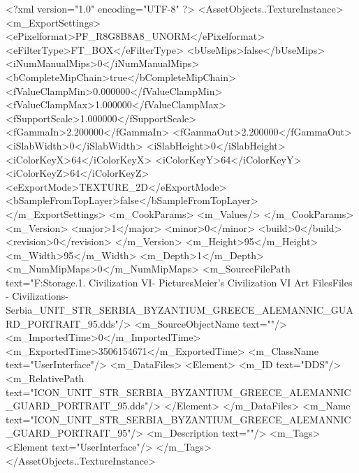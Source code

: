 <?xml version="1.0" encoding="UTF-8" ?>
<AssetObjects..TextureInstance>
	<m_ExportSettings>
		<ePixelformat>PF_R8G8B8A8_UNORM</ePixelformat>
		<eFilterType>FT_BOX</eFilterType>
		<bUseMips>false</bUseMips>
		<iNumManualMips>0</iNumManualMips>
		<bCompleteMipChain>true</bCompleteMipChain>
		<fValueClampMin>0.000000</fValueClampMin>
		<fValueClampMax>1.000000</fValueClampMax>
		<fSupportScale>1.000000</fSupportScale>
		<fGammaIn>2.200000</fGammaIn>
		<fGammaOut>2.200000</fGammaOut>
		<iSlabWidth>0</iSlabWidth>
		<iSlabHeight>0</iSlabHeight>
		<iColorKeyX>64</iColorKeyX>
		<iColorKeyY>64</iColorKeyY>
		<iColorKeyZ>64</iColorKeyZ>
		<eExportMode>TEXTURE_2D</eExportMode>
		<bSampleFromTopLayer>false</bSampleFromTopLayer>
	</m_ExportSettings>
	<m_CookParams>
		<m_Values/>
	</m_CookParams>
	<m_Version>
		<major>1</major>
		<minor>0</minor>
		<build>0</build>
		<revision>0</revision>
	</m_Version>
	<m_Height>95</m_Height>
	<m_Width>95</m_Width>
	<m_Depth>1</m_Depth>
	<m_NumMipMaps>0</m_NumMipMaps>
	<m_SourceFilePath text="F:\Mod Storage\2.1. Civilization VI\Mods\Archive - Pictures\Sid Meier's Civilization VI Art Files\Art Files - Civilizations\Civilization - Serbia\ICON_UNIT_STR_SERBIA_BYZANTIUM_GREECE_ALEMANNIC_GUARD_PORTRAIT_95.dds"/>
	<m_SourceObjectName text=""/>
	<m_ImportedTime>0</m_ImportedTime>
	<m_ExportedTime>3506154671</m_ExportedTime>
	<m_ClassName text="UserInterface"/>
	<m_DataFiles>
		<Element>
			<m_ID text="DDS"/>
			<m_RelativePath text="ICON_UNIT_STR_SERBIA_BYZANTIUM_GREECE_ALEMANNIC_GUARD_PORTRAIT_95.dds"/>
		</Element>
	</m_DataFiles>
	<m_Name text="ICON_UNIT_STR_SERBIA_BYZANTIUM_GREECE_ALEMANNIC_GUARD_PORTRAIT_95"/>
	<m_Description text=""/>
	<m_Tags>
		<Element text="UserInterface"/>
	</m_Tags>
</AssetObjects..TextureInstance>

